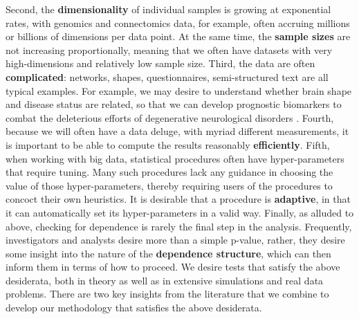 \documentclass[11pt]{article}
\providecommand{\sct}[1]{{\normalfont\textsc{#1}}}
\newcommand{\Mgc}{\sct{Mgc}}
\begin{document}
Second, the \textbf{dimensionality} of individual samples is growing at exponential rates, with genomics and connectomics data, for example, often accruing millions or billions of dimensions per data point. At the same time, the \textbf{sample sizes} are not increasing proportionally, meaning that we often have datasets with very high-dimensions and relatively low sample size.
%
Third, the data are often \textbf{complicated}: networks, shapes, questionnaires, semi-structured text are all typical examples.
For example, we may desire to understand whether brain shape and disease status are related, so that we can develop prognostic biomarkers to combat the deleterious efforts of degenerative neurological disorders \cite{ParkEtAl2008}.
%
%
Fourth, because we will often have a data deluge, with myriad different measurements, it is important to be able to compute the results reasonably \textbf{efficiently}.
%
Fifth, when working with big data, statistical procedures often have hyper-parameters that require tuning.  Many such procedures lack any guidance in choosing the value of those hyper-parameters, thereby requiring users of the procedures to concoct their own heuristics. It is desirable that a procedure is \textbf{adaptive}, in that it can automatically set its hyper-parameters in a valid way.
%
Finally, as alluded to above, checking for dependence is rarely the final step in the analysis.  Frequently, investigators and analysts desire more than a simple p-value, rather, they desire some insight into the nature of the \textbf{dependence structure}, which can then inform them in terms of how to proceed.
%
We desire tests that satisfy the above desiderata, both in theory as well as in extensive simulations and real data problems.
% 
% 
There are two key insights from the literature that we combine to develop our methodology that satisfies the above desiderata.  

\end{document}
